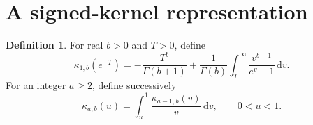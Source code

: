 \documentclass[11pt,a4paper]{article}
\numberwithin{equation}{section}
\theoremstyle{definition}
\newtheorem{definition}[theorem]{Definition}
\theoremstyle{remark}
\newcommand{\dd}{\,\mathrm{d}}
\begin{document}
\section{A signed-kernel representation}
\label{sec:kernel}

\begin{definition}\label{def:kappa}
For real $b>0$ and $T>0$, define
\begin{equation}\label{eq:kappa-base}
 \kappa_{1,b}(e^{-T})=
 -\frac{T^b}{\Gamma(b+1)}
 +\frac1{\Gamma(b)}\int_T^\infty\frac{v^{b-1}}{e^v-1}\dd v.
\end{equation}
For an integer $a\ge2$, define successively
\begin{equation}\label{eq:kappa-recursion}
 \kappa_{a,b}(u)=\int_u^1\frac{\kappa_{a-1,b}(v)}{v}\dd v,
 \qquad 0<u<1.
\end{equation}
\end{definition}
\end{document}
